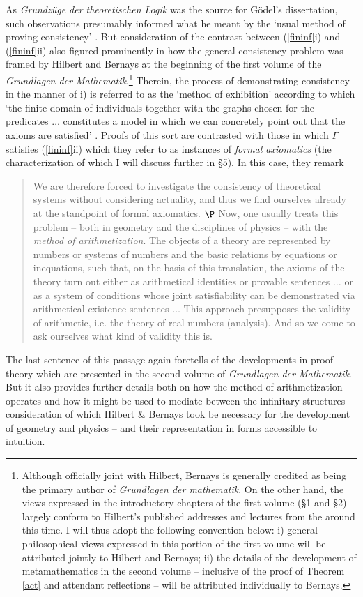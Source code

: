 \documentclass[11pt,fleqn,leqno]{article}
\begin{document}
As \textsl{Grundz\"uge der theoretischen Logik} was the source for G\"odel's dissertation, such observations presumably informed what he meant by the `usual method of proving consistency' \citeyearpar{Godel1929a}.  But consideration of the contrast between (\ref{fininf}i) and (\ref{fininf}ii) also figured prominently in how the general consistency problem was framed by Hilbert and Bernays at the beginning of the first volume of the \textsl{Grundlagen der Mathematik}.\footnote{Although officially joint with Hilbert, Bernays is generally credited as being the primary author of \textsl{Grundlagen der mathematik}.  On the other hand, the views expressed in the introductory chapters of the first volume (\S 1 and \S 2) largely conform to Hilbert's published addresses and lectures from the around this time.  I will thus  adopt the following convention below: i) general philosophical views expressed in this portion of the first volume will be attributed jointly to Hilbert and Bernays; ii) the details of the development of metamathematics in the second volume -- inclusive of the proof of Theorem \ref{act} and attendant reflections -- will be attributed individually to Bernays.} Therein, the process of demonstrating consistency in the manner of i) is referred to as the `method of exhibition' according to which `the finite domain of individuals together with the graphs chosen for the predicates $\ldots$ constitutes a model in which we can concretely point out that the axioms are satisfied' \citeyearpar[p. 12]{Hilbert1934}.   Proofs of this sort are contrasted with those in which $\Gamma$ satisfies (\ref{fininf}ii) which they refer to as instances of \textsl{formal axiomatics} (the characterization of which I will discuss further in \S 5).   In this case, they remark
\begin{quote}
{\footnotesize We are therefore forced to investigate the consistency of theoretical systems without considering actuality, and thus we find ourselves already at the standpoint of formal axiomatics. $\P$
Now, one usually treats this problem -- both in geometry and the disciplines of physics -- with the \textsl{method of arithmetization}.  The objects of a theory are represented by numbers or systems of numbers and the basic relations by equations or inequations, such that, on the basis of this translation, the axioms of the theory turn out either as arithmetical identities or provable sentences $\ldots$ or as a system of conditions whose joint satisfiability can be demonstrated via arithmetical existence sentences $\ldots$ This approach presupposes the validity of arithmetic, i.e. the theory of real numbers (analysis). And so we come to ask ourselves what kind of validity this is. \hfill \citeyearpar[p. 3]{Hilbert1934}} 
\end{quote}
The last sentence of this passage again foretells of the developments in proof theory which are presented in the second volume of  \textsl{Grundlagen der Mathematik}.   But it also provides further details both on how the method of arithmetization operates and how it might be used to mediate between the infinitary structures -- consideration of which Hilbert \& Bernays took be necessary for the development of geometry and physics -- and their representation in forms accessible to intuition.  
\end{document}

